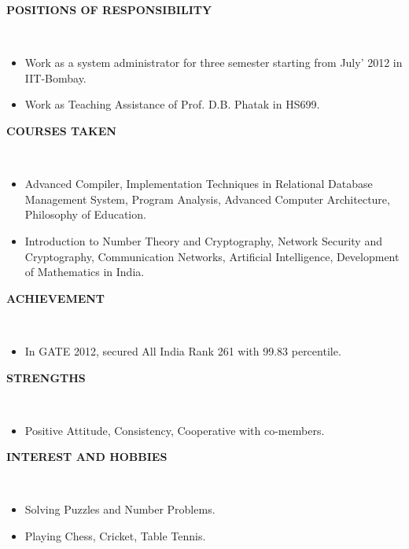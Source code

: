 \documentclass[a4paper,10pt]{article}
\newcommand{\isep}{-2 pt}
\newcommand{\lsep}{-0.5cm}
\newcommand{\resheading}[1]{{\small \colorbox{mygrey}{\begin{minipage}{0.975\textwidth}{\textbf{#1 \vphantom{p\^{E}}}}\end{minipage}}}}
\begin{document}
\resheading{\textbf{POSITIONS OF RESPONSIBILITY} }\\[\lsep]
\begin{itemize}\itemsep \isep
\item Work as a system administrator for three semester starting from July' 2012 in IIT-Bombay.

\item Work as Teaching Assistance of Prof. D.B. Phatak in HS699.
\end{itemize}

\resheading{\textbf{COURSES TAKEN} }\\[\lsep]
\begin{itemize}
\item Advanced Compiler, Implementation Techniques in Relational Database Management System, Program Analysis, Advanced Computer Architecture, Philosophy of Education. 
\item Introduction to Number Theory and Cryptography, Network Security and Cryptography, Communication Networks, Artificial Intelligence, Development of Mathematics in India.
\end{itemize}

\resheading{\textbf{ACHIEVEMENT} }\\[\lsep]
\begin{itemize}
\item \noindent In GATE 2012, secured All India Rank 261 with 99.83 percentile.
\end{itemize}

\resheading{\textbf{STRENGTHS} }\\[\lsep]
\begin{itemize}
\item \noindent Positive Attitude, Consistency, Cooperative with co-members.
\end{itemize}

\resheading{\textbf{INTEREST AND HOBBIES} }\\[\lsep]
\begin{itemize}
\item \noindent Solving Puzzles and Number Problems.
\item \noindent Playing Chess, Cricket, Table Tennis.

\end{itemize}
\end{document}
